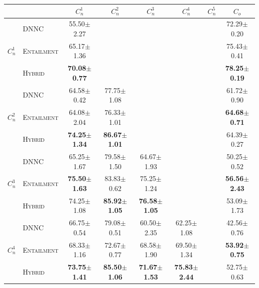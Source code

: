 \documentclass[11pt]{article}
\newcommand{\modelname}{\textsc{Entailment}}
\newcommand{\hybrid}{\textsc{Hybrid}}
\begin{document}
\begin{table}[t]
\setlength{\tabcolsep}{4.5pt}
\small
  \centering
  \begin{tabular}{ll|c|c|c|c|c|c}
 &  & $C_n^1$ & $C_n^2$ & $C_n^3$ & $C_n^4$ & $C_n^5$ & $C_o$\\\hline\hline 

 \multirow{3}{*}{$C_n^1$} 
 &  DNNC & 55.50$\pm$2.27 & & & & & 72.29$\pm$0.20\\
 & \modelname &65.17$\pm$1.36 & & & & &75.43$\pm$0.41 \\
  &  \hybrid & \textbf{70.08$\pm$0.77} & & & & & \textbf{78.25$\pm$0.19}\\\hline

 \multirow{3}{*}{$C_n^2$} &  DNNC &64.58$\pm$0.42 &77.75$\pm$1.08 & & & & 61.72$\pm$0.90\\
 &   \modelname &64.08$\pm$2.04 &76.33$\pm$1.01 & & & &\textbf{64.68$\pm$0.71}\\
  & \hybrid  & \textbf{74.25$\pm$1.34} &\textbf{86.67$\pm$1.01} & & & &64.39$\pm$0.27 \\\hline
 
  \multirow{3}{*}{$C_n^3$} &  DNNC & 65.25$\pm$1.67 &79.58$\pm$1.50 &64.67$\pm$1.93 & & & 50.25$\pm$0.52\\
  &   \modelname  &\textbf{75.50$\pm$1.63} &83.83$\pm$0.62 &75.25$\pm$1.24 & & &\textbf{56.56$\pm$2.43} \\
  & \hybrid & 74.25$\pm$1.08 & \textbf{85.92$\pm$1.05}& \textbf{76.58$\pm$1.05}& & &53.09$\pm$1.73 \\\hline
  
   \multirow{3}{*}{$C_n^4$}& DNNC &66.75$\pm$0.54 &79.08$\pm$0.51 & 60.50$\pm$2.35& 62.25$\pm$1.08& &  42.56$\pm$0.76\\
   &   \modelname &68.33$\pm$1.16 &72.67$\pm$0.77 &68.58$\pm$1.90 & 69.50$\pm$1.34& &\textbf{53.92$\pm$0.75}\\
  
  &  \hybrid & \textbf{73.75$\pm$1.41} &\textbf{85.50$\pm$1.06} & \textbf{71.67$\pm$1.53}& \textbf{75.83$\pm$2.44}& & 52.75$\pm$0.63\\\hline
  

\end{tabular}
\end{table}
\end{document}
